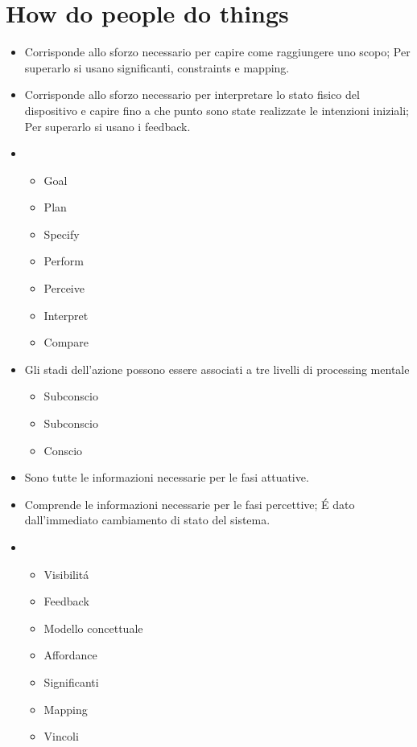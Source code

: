 \chapter{How do people do things}

\begin{itemize}
    \item {} Corrisponde allo sforzo necessario per capire come raggiungere uno scopo; Per superarlo si usano significanti, constraints e mapping.
    \item {} Corrisponde allo sforzo necessario per interpretare lo stato fisico del dispositivo e capire fino a che punto sono state realizzate le intenzioni iniziali; Per superarlo si usano i feedback.
    \item {}
    \begin{itemize}
        \item Goal
        \item Plan
        \item Specify
        \item Perform
        \item Perceive
        \item Interpret
        \item Compare
    \end{itemize}
    \item Gli stadi dell'azione possono essere associati a tre livelli di processing mentale
    \begin{itemize}
        \item {} Subconscio
        \item {} Subconscio
        \item {} Conscio
    \end{itemize}
    \item {} Sono tutte le informazioni necessarie per le fasi attuative.
    \item {} Comprende le informazioni necessarie per le fasi percet\-tive; \'E dato dall'immediato cambiamento di stato del sistema.
    \item {}
    \begin{itemize}
        \item Visibilit\'a
        \item Feedback
        \item Modello concettuale
        \item Affordance
        \item Significanti
        \item Mapping
        \item Vincoli
    \end{itemize}
\end{itemize}